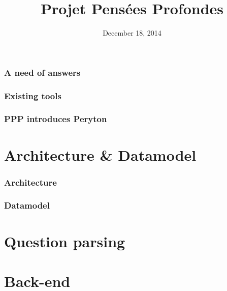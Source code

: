 \documentclass[10pt, compress]{beamer}
\title{Projet Pensées Profondes}
\subtitle{}
\date{December 18, 2014}
\institute{École Normale Supérieure de Lyon}
\begin{document}
\maketitle

\begin{frame}[fragile]
    \frametitle{A need of answers}
\end{frame}

\begin{frame}[fragile]
    \frametitle{Existing tools}
\end{frame}

\begin{frame}[fragile]
    \frametitle{PPP introduces Peryton}
\end{frame}

\section{Architecture \& Datamodel}
\begin{frame}[fragile]
    \frametitle{Architecture}
    \begin{figure}
        \resizebox{.9\linewidth}{!}{
            
        }
    \end{figure}
\end{frame}

\begin{frame}[fragile]
    \frametitle{Datamodel}
\end{frame}

\section{Question parsing}

\section{Back-end}

\end{document}
